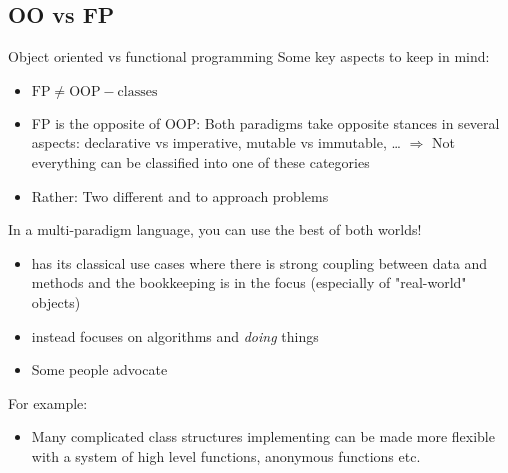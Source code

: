 \subsection{OO vs FP}

\begin{frame}{Object oriented vs functional programming}
	Some key aspects to keep in mind:
	\begin{itemize}
		\item $\text{FP} \neq \text{OOP} - \text{classes}$
		\item FP is  the opposite of OOP: Both paradigms take opposite stances in several aspects: declarative vs imperative, mutable vs immutable, \dots{} $\Longrightarrow$ Not everything can be classified into one of these categories
		\item Rather: Two different  and to approach problems 
	\end{itemize}
	
	\medskip	
	In a multi-paradigm language, you can use the best of both worlds!
	\begin{itemize}
		\item {} has its classical use cases where there is strong coupling between data and methods and the bookkeeping is in the focus (especially of "real-world" objects)
		\item {} instead focuses on algorithms and \emph{doing} things
		\item Some people advocate  
	\end{itemize}

	For example:
	\begin{itemize}
		\item Many complicated class structures implementing  can be made more flexible with a system of high level functions, anonymous functions etc.
	\end{itemize}
\end{frame}
